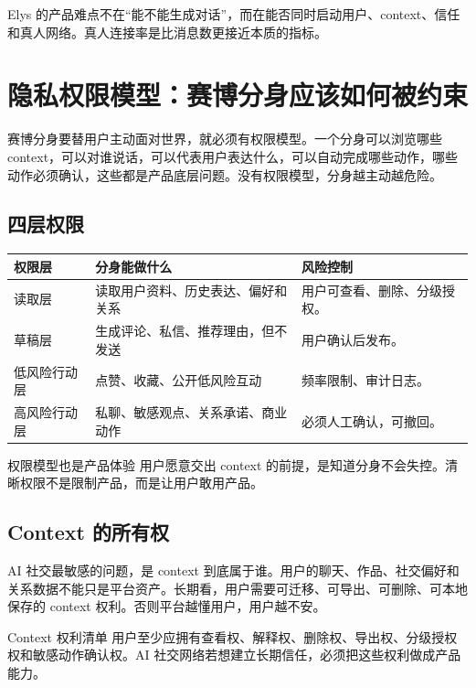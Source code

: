 \documentclass[a4paper]{article}
\begin{document}
Elys 的产品难点不在“能不能生成对话”，而在能否同时启动用户、context、信任和真人网络。真人连接率是比消息数更接近本质的指标。

\section{隐私权限模型：赛博分身应该如何被约束}

赛博分身要替用户主动面对世界，就必须有权限模型。一个分身可以浏览哪些 context，可以对谁说话，可以代表用户表达什么，可以自动完成哪些动作，哪些动作必须确认，这些都是产品底层问题。没有权限模型，分身越主动越危险。

\subsection{四层权限}

\noindent\begin{tabularx}{\textwidth}{p{}p{}X}
\toprule
权限层 & 分身能做什么 & 风险控制 \\
\midrule
读取层 & 读取用户资料、历史表达、偏好和关系 & 用户可查看、删除、分级授权。 \\
草稿层 & 生成评论、私信、推荐理由，但不发送 & 用户确认后发布。 \\
低风险行动层 & 点赞、收藏、公开低风险互动 & 频率限制、审计日志。 \\
高风险行动层 & 私聊、敏感观点、关系承诺、商业动作 & 必须人工确认，可撤回。 \\
\bottomrule
\end{tabularx}

\begin{knowledgebox}{权限模型也是产品体验}
用户愿意交出 context 的前提，是知道分身不会失控。清晰权限不是限制产品，而是让用户敢用产品。
\end{knowledgebox}

\subsection{Context 的所有权}

AI 社交最敏感的问题，是 context 到底属于谁。用户的聊天、作品、社交偏好和关系数据不能只是平台资产。长期看，用户需要可迁移、可导出、可删除、可本地保存的 context 权利。否则平台越懂用户，用户越不安。

\begin{importantbox}{Context 权利清单}
用户至少应拥有查看权、解释权、删除权、导出权、分级授权权和敏感动作确认权。AI 社交网络若想建立长期信任，必须把这些权利做成产品能力。
\end{importantbox}
\end{document}
